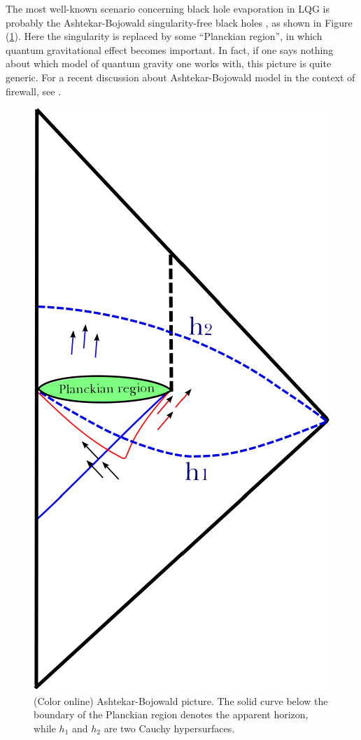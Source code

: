\documentclass[12pt]{article}
\newcommand{\2}{$^2$}
\newcommand{\3}{$^3$}
\newcommand{\4}{$_4$}
\newcommand{\5}{$_5$}
\begin{document}
The most well-known scenario concerning black hole evaporation in LQG is probably the Ashtekar-Bojowald singularity-free black holes \cite{BA}, as shown in Figure (\ref{fig:AB_2}).  Here the singularity is replaced by some ``Planckian region'', in which quantum gravitational effect becomes important. In fact, if one says nothing about which model of quantum gravity one works with, this picture is quite generic. For a recent discussion about Ashtekar-Bojowald model in the context of firewall, see \cite{1410.7062}.

\begin{figure}
\begin{center}
\includegraphics[scale=0.95]{AB_2-eps-converted-to.pdf}
\caption{\label{fig:AB_2}(Color online) Ashtekar-Bojowald picture. The solid curve below the boundary of the Planckian region denotes the apparent horizon, while $h_1$ and $h_2$ are two Cauchy hypersurfaces.}
\end{center}
\end{figure} 
\end{document}
